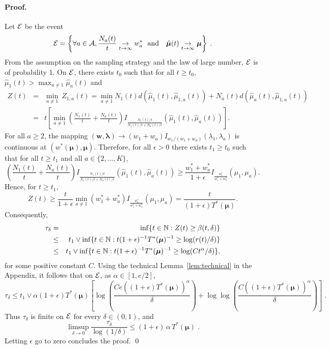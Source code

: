 \documentclass{colt2016} %
\begin{document}
\paragraph{Proof.}
Let $\mathcal{E}$ be the event 
\[\cE = \left\{\forall a \in \Arms, \frac{N_a(t)}{t} \underset{t \rightarrow \infty}{\rightarrow} w_a^* \ \ \text{and} \ \ \ \hat{\bm \mu}(t) \underset{t \rightarrow \infty}{\rightarrow} \bm \mu\right\}\;.\]
From the assumption on the sampling strategy and the law of large number, $\mathcal{E}$ is of probability 1.
On $\mathcal{E}$, there exists $t_0$ such that for all $t \geq t_0$, $\hat{\mu}_1(t) > \max_{a \neq 1} \hat{\mu}_a(t)$ and
\begin{eqnarray*}
 Z(t) & = & \min_{a \neq 1} \ Z_{1,a}(t) =  \min_{a \neq 1} N_1(t)d(\hat{\mu}_1(t) , \hat{\mu}_{1,a}(t)) + N_a(t) d(\hat{\mu}_a(t),\hat{\mu}_{1,a}(t))\\
 & = & t \left[\min_{a \neq 1} \left(\frac{N_1(t)}{t} + \frac{N_a(t)}{t}\right)I_{\frac{N_1(t)/t}{N_1(t)/t + N_a(t)/t}}\left(\hat{\mu}_1(t),\hat{\mu}_a(t)\right)  \right]. 
\end{eqnarray*}
For all $a \geq 2$, the mapping $(\bm w , \bm \lambda) \rightarrow (w_1 + w_a) I_{w_1/(w_1 + w_a)}(\lambda_1,\lambda_a)$ is continuous at $(w^*(\bm \mu),\bm \mu)$. 
Therefore, for all $\epsilon > 0$ there exists $t_1 \geq t_0$ such that for all $t \geq t_1$ and all $a\in \{2,\dots,K\}$,
\[\left(\frac{N_1(t)}{t} + \frac{N_a(t)}{t}\right)I_{\frac{N_1(t)/t}{N_1(t)/t + N_a(t)/t}}\left(\hat{\mu}_1(t),\hat{\mu}_a(t)\right) \geq \frac{w^*_1 + w^*_a}{1+\epsilon}I_{\frac{w_1^*}{w_1^*+ w_a^*}}\left({\mu}_1,{\mu}_a\right).\]
Hence, for $t \geq t_1$, 
\[Z(t) \geq \frac{t}{1+\epsilon} \min_{a \neq 1}\left(w^*_1 + w^*_a\right)I_{\frac{w_1^*}{w_1^*+ w_a^*}}\left({\mu}_1,{\mu}_a\right) = \frac{t}{(1+\epsilon)T^*(\bm \mu)}.\]
Consequently,
\begin{eqnarray*}
 \tau_\delta &= &  \inf\{ t \in \mathbb{N} : Z(t) \geq \beta(t,\delta) \} \\
 & \leq & t_1 \vee \inf\{t \in \mathbb{N} : t (1+\epsilon)^{-1}T^*(\bm \mu)^{-1} \geq \log(r(t) /\delta) \} \\ 
 & \leq & t_1 \vee \inf\{t \in \mathbb{N} : t (1+\epsilon)^{-1}T^*(\bm \mu)^{-1} \geq \log(Ct^{\alpha} /\delta) \}, 
\end{eqnarray*}
for some positive constant $C$. Using the technical Lemma~\ref{lem:technical} in the Appendix, it follows that on $\mathcal{E}$, as $\alpha \in [1,e/2]$,
\[\tau_\delta \leq t_1 \vee \alpha (1+\epsilon) T^*(\bm \mu) \left[\log \left(\frac{Ce((1+\epsilon)T^*(\bm \mu))^\alpha}{\delta}\right) +  \log\log \left(\frac{C((1+\epsilon)T^*(\bm \mu))^\alpha}{\delta}\right)\right]\;.\]
Thus $\tau_\delta$ is finite on $\mathcal{E}$ for every $\delta \in (0,1)$, and 
\[\limsup_{\delta \rightarrow 0} \frac{\tau_\delta}{\log(1/\delta)} \leq (1+\epsilon)\,\alpha\,  T^*(\bm \mu)\;.\]
Letting $\epsilon$ go to zero concludes the proof.
\qed
\end{document}

